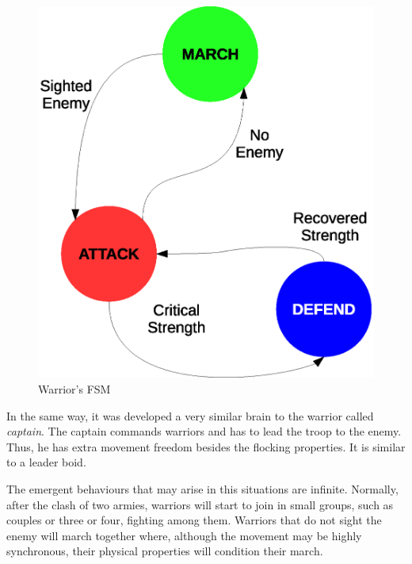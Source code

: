 \begin{figure}[!h]
  \centering
 \includegraphics[scale=0.35]{warriorFSM.eps}
  \caption{Warrior's FSM}
\end{figure}

In the same way, it was developed a very similar brain to the warrior called \emph{captain}. The captain commands warriors and has to lead the troop to the enemy. Thus, he has extra movement freedom besides the flocking properties. It is similar to a leader boid.

The emergent behaviours that may arise in this situations are infinite. Normally, after the clash of two armies, warriors will start to join in small groups, such as couples or three or four, fighting among them. Warriors that do not sight the enemy will march together where, although the movement may be highly synchronous, their physical properties will condition their march.


